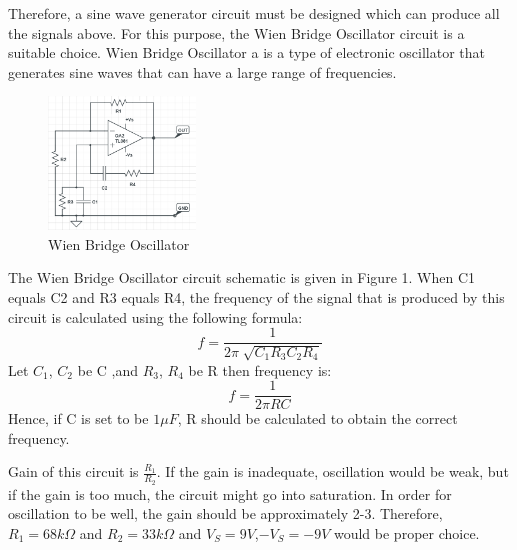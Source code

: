 \documentclass[letterpaper,12pt]{article}
\begin{document}
Therefore, a sine wave generator circuit must be designed which can produce all the signals above. For this purpose, the Wien Bridge Oscillator circuit is a suitable choice. Wien Bridge Oscillator a is a type of electronic oscillator that generates sine waves that can have a large range of frequencies.
\begin{figure}[h]
    \centering
    \includegraphics[width = 0.35\textwidth]{WIENBRDGE.png}
    \caption{Wien Bridge Oscillator}
\end{figure} 
The Wien Bridge Oscillator circuit schematic is given in Figure 1. When C1 equals C2 and R3 equals R4, the frequency of the signal that is produced by this circuit is calculated using the following formula:
\[f = \frac{1}{2\pi \sqrt[]{C_1R_3C_2R_4}}\]
Let \(C_1\), \(C_2\) be C ,and \(R_3\), \(R_4\) be R then frequency is:
\[f = \frac{1}{2\pi RC}\]
Hence, if C is set to be \(1\mu F\), R should be calculated to obtain the correct frequency. 

Gain of this circuit is \(\frac{R_1}{R_2}\). If the gain is inadequate, oscillation would be weak, but if the gain is too much, the circuit might go into saturation. In order for oscillation to be well, the gain should be approximately 2-3. Therefore, \(R_1 = 68k\Omega\) and \(R_2 = 33k\Omega\) and \(V_S = 9V\),\(-V_S = -9V\) would be proper choice.
\end{document}
